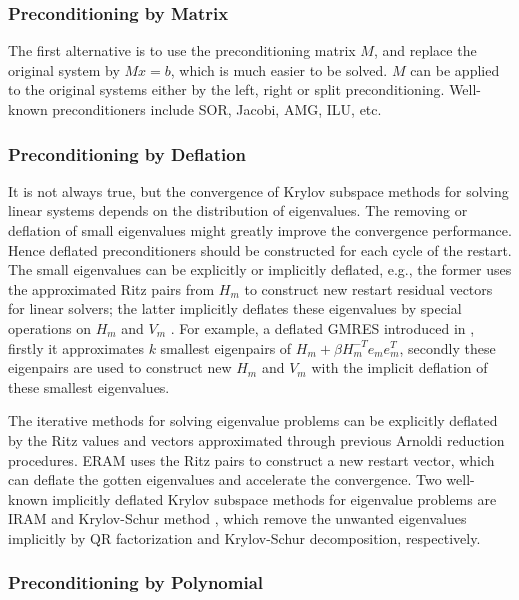 \subsubsection{Preconditioning by Matrix}

The first alternative is to use the preconditioning matrix $M$, and replace the original system by $Mx=b$, which is much easier to be solved. $M$ can be applied to the original systems either by the left, right or split preconditioning. Well-known preconditioners include SOR, Jacobi, AMG, ILU, etc.

\subsubsection{Preconditioning by Deflation}

It is not always true, but the convergence of Krylov subspace methods for solving linear systems depends on the distribution of eigenvalues. The removing or deflation of small eigenvalues might greatly improve the convergence performance. Hence deflated preconditioners should be constructed for each cycle of the restart. The small eigenvalues can be explicitly or implicitly deflated, e.g., the former uses the approximated Ritz pairs from $H_m$ to construct new restart residual vectors for linear solvers; the latter implicitly deflates these eigenvalues by special operations on $H_m$ and $V_m$ \cite{erhel1996restarted,burrage1998deflation,morgan2002gmres}. For example, a deflated GMRES introduced in \cite{morgan2002gmres}, firstly it approximates $k$ smallest eigenpairs of $H_m+\beta H_m^{-T}e_me_m^T$, secondly these eigenpairs are used to construct new $H_m$ and $V_m$ with the implicit deflation of these smallest eigenvalues.

The iterative methods for solving eigenvalue problems can be explicitly deflated by the Ritz values and vectors approximated through previous Arnoldi reduction procedures. ERAM uses the Ritz pairs to construct a new restart vector, which can deflate the gotten eigenvalues and accelerate the convergence. Two well-known implicitly deflated Krylov subspace methods for eigenvalue problems are IRAM and Krylov-Schur method \cite{stewart2002krylov}, which remove the unwanted eigenvalues implicitly by QR factorization and Krylov-Schur decomposition, respectively.

\subsubsection{Preconditioning by Polynomial}


